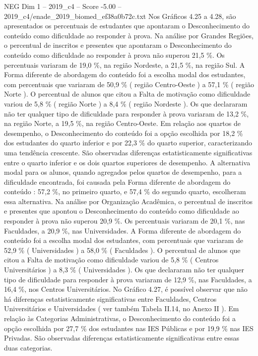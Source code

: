 \begin{textsample}{NEG Dim 1 – 2019\_c4 – Score -5.00 – 2019\_c4/enade\_2019\_biomed\_ef38a0b72c.txt}
Nos Gráficos 4.25 a 4.28, são apresentados os percentuais de estudantes que apontaram o Desconhecimento do conteúdo como dificuldade ao responder à prova.
Na análise por Grandes Regiões, o percentual de inscritos e presentes que apontaram o Desconhecimento do conteúdo como dificuldade ao responder à prova não superou 21,5 \%.
Os percentuais variaram de 19,0 \%, na região Nordeste, a 21,5 \%, na região Sul.
A Forma diferente de abordagem do conteúdo foi a escolha modal dos estudantes, com percentuais que variaram de 50,9 \% ( região Centro-Oeste ) a 57,1 \% ( região Norte ).
O percentual de alunos que citou a Falta de motivação como dificuldade variou de 5,8 \% ( região Norte ) a 8,4 \% ( região Nordeste ).
Os que declararam não ter qualquer tipo de dificuldade para responder à prova variaram de 13,2 \%, na região Norte, a 19,5 \%, na região Centro-Oeste.
Em relação aos quartos de desempenho, o Desconhecimento do conteúdo foi a opção escolhida por 18,2 \% dos estudantes do quarto inferior e por 22,3 \% do quarto superior, caracterizando uma tendência crescente.
São observadas diferenças estatisticamente significativas entre o quarto inferior e os dois quartos superiores de desempenho.
A alternativa modal para os alunos, quando agregados pelos quartos de desempenho, para a dificuldade encontrada, foi causada pela Forma diferente de abordagem do conteúdo : 57,2 \%, no primeiro quarto, e 57,4 \% do segundo quarto, escolheram essa alternativa.
Na análise por Organização Acadêmica, o percentual de inscritos e presentes que apontou o Desconhecimento do conteúdo como dificuldade ao responder à prova não superou 20,9 \%.
Os percentuais variaram de 20,1 \%, nas Faculdades, a 20,9 \%, nas Universidades.
A Forma diferente de abordagem do conteúdo foi a escolha modal dos estudantes, com percentuais que variaram de 52,9 \% ( Universidades ) a 58,0 \% ( Faculdades ).
O percentual de alunos que citou a Falta de motivação como dificuldade variou de 5,8 \% ( Centros Universitários ) a 8,3 \% ( Universidades ).
Os que declararam não ter qualquer tipo de dificuldade para responder à prova variaram de 12,9 \%, nas Faculdades, a 16,4 \%, nos Centros Universitários.
No Gráfico 4.27, é possível observar que não há diferenças estatisticamente significativas entre Faculdades, Centros Universitários e Universidades ( ver também Tabela II.14, no Anexo II ).
Em relação às Categorias Administrativas, o Desconhecimento do conteúdo foi a opção escolhida por 27,7 \% dos estudantes nas IES Públicas e por 19,9 \% nas IES Privadas.
São observadas diferenças estatisticamente significativas entre essas duas categorias.

\end{textsample}
